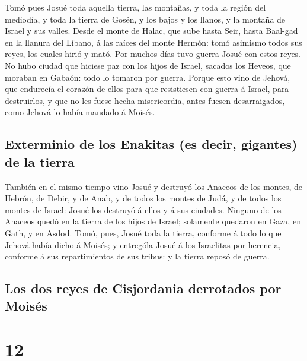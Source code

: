 Tomó pues Josué toda aquella tierra, las montañas, y toda
la región del mediodía, y toda la tierra de Gosén, y los bajos y los
llanos, y la montaña de Israel y sus valles.  Desde el
monte de Halac, que sube hasta Seir, hasta Baal-gad en la llanura del
Líbano, á las raíces del monte Hermón: tomó asimismo todos sus reyes,
los cuales hirió y mató.  Por muchos días tuvo guerra Josué
con estos reyes.  No hubo ciudad que hiciese paz con los
hijos de Israel, sacados los Heveos, que moraban en Gabaón: todo lo
tomaron por guerra.  Porque esto vino de Jehová, que
endurecía el corazón de ellos para que resistiesen con guerra á Israel,
para destruirlos, y que no les fuese hecha misericordia, antes fuesen
desarraigados, como Jehová lo había mandado á Moisés.

\hypertarget{exterminio-de-los-enakitas-es-decir-gigantes-de-la-tierra}{%
\subsection{Exterminio de los Enakitas (es decir, gigantes) de la
tierra}\label{exterminio-de-los-enakitas-es-decir-gigantes-de-la-tierra}}

 También en el mismo tiempo vino Josué y destruyó los
Anaceos de los montes, de Hebrón, de Debir, y de Anab, y de todos los
montes de Judá, y de todos los montes de Israel: Josué los destruyó á
ellos y á sus ciudades.  Ninguno de los Anaceos quedó en la
tierra de los hijos de Israel; solamente quedaron en Gaza, en Gath, y en
Asdod.  Tomó, pues, Josué toda la tierra, conforme á todo
lo que Jehová había dicho á Moisés; y entrególa Josué á los Israelitas
por herencia, conforme á sus repartimientos de sus tribus: y la tierra
reposó de guerra.

\hypertarget{los-dos-reyes-de-cisjordania-derrotados-por-moisuxe9s}{%
\subsection{Los dos reyes de Cisjordania derrotados por
Moisés}\label{los-dos-reyes-de-cisjordania-derrotados-por-moisuxe9s}}

\hypertarget{section-11}{%
\section{12}\label{section-11}}

